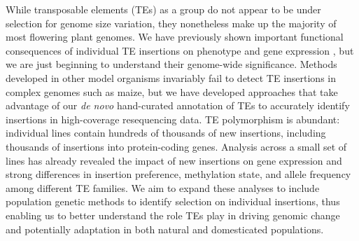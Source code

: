 \documentclass[11pt,letterpaper]{article}
\begin{document}
While transposable elements (TEs) as a group do not appear to be under selection for genome size variation, they nonetheless make up the majority of most flowering plant genomes. 
We have previously shown important functional consequences of individual TE insertions on phenotype and gene expression \cite{studer2011identification,makarevitch2015transposable}, but we are just beginning to understand their genome-wide significance.
Methods developed in other model organisms invariably fail to detect TE insertions in complex genomes such as maize, but we have developed approaches that take advantage of our \emph{de novo} hand-curated annotation of TEs to accurately identify insertions in high-coverage resequencing data.
TE polymorphism is abundant: individual lines contain hundreds of thousands of new insertions, including thousands of insertions into protein-coding genes.
Analysis across a small set of lines has already revealed the impact of new insertions on gene expression and strong differences in insertion preference, methylation state, and allele frequency among different TE families.
We aim to expand these analyses to include population genetic methods to identify selection on individual insertions, thus enabling us to better understand the role TEs play in driving genomic change and potentially adaptation in both natural and domesticated populations.


\newpage

\end{document}
